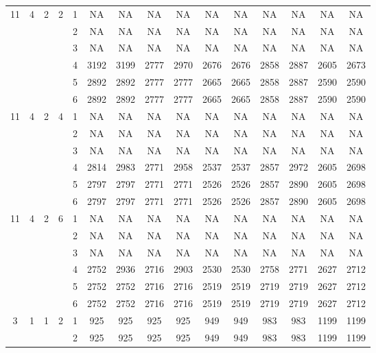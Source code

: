 \begin{longtable}{|c|c|c|c|c|c c|c c|c c|c c|c c|}
\hline
\multirow{6}{*}{11} & \multirow{6}{*}{4} & \multirow{6}{*}{2} & \multirow{6}{*}{2} & 1 & NA & NA & NA & NA & NA & NA & NA & NA & NA & NA \\
 & & & & 2 & NA & NA & NA & NA & NA & NA & NA & NA & NA & NA \\
 & & & & 3 & NA & NA & NA & NA & NA & NA & NA & NA & NA & NA \\
 & & & & 4 & 3192 & 3199 & 2777 & 2970 & 2676 & 2676 & 2858 & 2887 & 2605 & 2673 \\
 & & & & 5 & 2892 & 2892 & 2777 & 2777 & 2665 & 2665 & 2858 & 2887 & 2590 & 2590 \\
 & & & & 6 & 2892 & 2892 & 2777 & 2777 & 2665 & 2665 & 2858 & 2887 & 2590 & 2590 \\
\hline
\multirow{6}{*}{11} & \multirow{6}{*}{4} & \multirow{6}{*}{2} & \multirow{6}{*}{4} & 1 & NA & NA & NA & NA & NA & NA & NA & NA & NA & NA \\
 & & & & 2 & NA & NA & NA & NA & NA & NA & NA & NA & NA & NA \\
 & & & & 3 & NA & NA & NA & NA & NA & NA & NA & NA & NA & NA \\
 & & & & 4 & 2814 & 2983 & 2771 & 2958 & 2537 & 2537 & 2857 & 2972 & 2605 & 2698 \\
 & & & & 5 & 2797 & 2797 & 2771 & 2771 & 2526 & 2526 & 2857 & 2890 & 2605 & 2698 \\
 & & & & 6 & 2797 & 2797 & 2771 & 2771 & 2526 & 2526 & 2857 & 2890 & 2605 & 2698 \\
\hline
\multirow{6}{*}{11} & \multirow{6}{*}{4} & \multirow{6}{*}{2} & \multirow{6}{*}{6} & 1 & NA & NA & NA & NA & NA & NA & NA & NA & NA & NA \\
 & & & & 2 & NA & NA & NA & NA & NA & NA & NA & NA & NA & NA \\
 & & & & 3 & NA & NA & NA & NA & NA & NA & NA & NA & NA & NA \\
 & & & & 4 & 2752 & 2936 & 2716 & 2903 & 2530 & 2530 & 2758 & 2771 & 2627 & 2712 \\
 & & & & 5 & 2752 & 2752 & 2716 & 2716 & 2519 & 2519 & 2719 & 2719 & 2627 & 2712 \\
 & & & & 6 & 2752 & 2752 & 2716 & 2716 & 2519 & 2519 & 2719 & 2719 & 2627 & 2712 \\
\hline
\multirow{6}{*}{3} & \multirow{6}{*}{1} & \multirow{6}{*}{1} & \multirow{6}{*}{2} & 1 & 925 & 925 & 925 & 925 & 949 & 949 & 983 & 983 & 1199 & 1199 \\
 & & & & 2 & 925 & 925 & 925 & 925 & 949 & 949 & 983 & 983 & 1199 & 1199 \\

\end{longtable}
